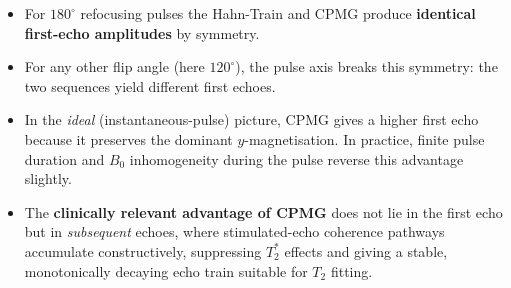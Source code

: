 \documentclass[11pt, a4paper]{article}
\begin{document}
\begin{itemize}
  \item For $180^\circ$ refocusing pulses the Hahn-Train and CPMG produce
        \textbf{identical first-echo amplitudes} by symmetry.
  \item For any other flip angle (here $120^\circ$), the pulse axis breaks this symmetry:
        the two sequences yield different first echoes.
  \item In the \emph{ideal} (instantaneous-pulse) picture, CPMG gives a higher first echo
        because it preserves the dominant $y$-magnetisation.  In practice, finite pulse
        duration and $B_0$ inhomogeneity during the pulse reverse this advantage slightly.
  \item The \textbf{clinically relevant advantage of CPMG} does not lie in the first echo
        but in \emph{subsequent} echoes, where stimulated-echo coherence pathways
        accumulate constructively, suppressing $T_2^*$ effects and giving a stable,
        monotonically decaying echo train suitable for $T_2$ fitting.
\end{itemize}
\end{document}
